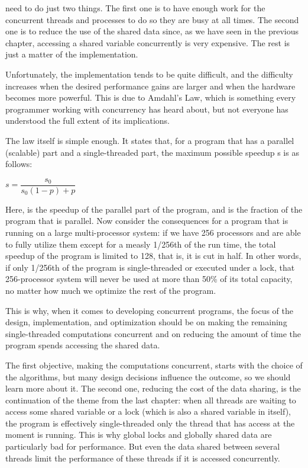 need to do just two things. The first one is to have enough work for the concurrent threads and processes to do so they are busy at all times. The second one is to reduce the use of the shared data since, as we have seen in the previous chapter, accessing a shared variable concurrently is very expensive. The rest is just a matter of the implementation.

Unfortunately, the implementation tends to be quite difficult, and the difficulty increases when the desired performance gains are larger and when the hardware becomes more powerful. This is due to Amdahl's Law, which is something every programmer working with concurrency has heard about, but not everyone has understood the full extent of its implications.

The law itself is simple enough. It states that, for a program that has a parallel (scalable) part and a single-threaded part, the maximum possible speedup s is as follows:

\begin{center}
$ s = \dfrac{s_0}{s_0(1-p)+p} $
\end{center}

Here, is the speedup of the parallel part of the program, and is the fraction of the program that is parallel. Now consider the consequences for a program that is running on a large multi-processor system: if we have 256 processors and are able to fully utilize them except for a measly 1/256th of the run time, the total speedup of the program is limited to 128, that is, it is cut in half. In other words, if only 1/256th of the program is single-threaded or executed under a lock, that 256-processor system will never be used at more than 50\% of its total capacity, no matter how much we optimize the rest of the program.

This is why, when it comes to developing concurrent programs, the focus of the design, implementation, and optimization should be on making the remaining single-threaded computations concurrent and on reducing the amount of time the program spends accessing the shared data.

The first objective, making the computations concurrent, starts with the choice of the algorithms, but many design decisions influence the outcome, so we should learn more about it. The second one, reducing the cost of the data sharing, is the continuation of the theme from the last chapter: when all threads are waiting to access some shared variable or a lock (which is also a shared variable in itself), the program is effectively single-threaded only the thread that has access at the moment is running. This is why global locks and globally shared data are particularly bad for performance. But even the data shared between several threads limit the performance of these threads if it is accessed concurrently.

